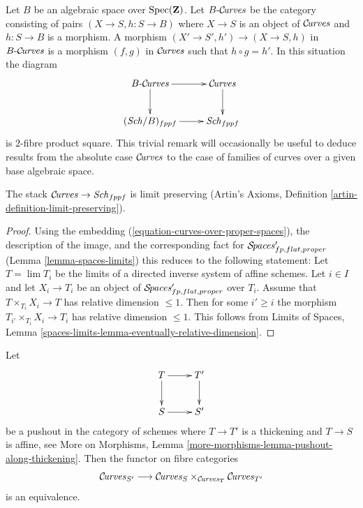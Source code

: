 \begin{remark}
\label{remark-curves-base-change}
Let $B$ be an algebraic space over $\mathop{\mathrm{Spec}}(\mathbf{Z})$.
Let $B\text{-}\mathcal{C}\!\mathit{urves}$ be the category consisting
of pairs $(X \to S, h : S \to B)$
where $X \to S$ is an object of
$\mathcal{C}\!\mathit{urves}$ and $h : S \to B$ is a morphism.
A morphism $(X' \to S', h') \to (X \to S, h)$
in $B\text{-}\mathcal{C}\!\mathit{urves}$ is a morphism $(f, g)$
in $\mathcal{C}\!\mathit{urves}$ such that $h \circ g = h'$.
In this situation the diagram
$$
\xymatrix{
B\text{-}\Curvesstack \ar[r] \ar[d] & \Curvesstack \ar[d] \\
(\Sch/B)_{fppf} \ar[r] & \Sch_{fppf}
}
$$
is $2$-fibre product square. This trivial remark
will occasionally be useful to deduce results from
the absolute case $\mathcal{C}\!\mathit{urves}$ to the case
of families of curves over a given base algebraic space.
\end{remark}

\begin{lemma}
\label{lemma-curves-limits}
The stack $\mathcal{C}\!\mathit{urves} \to \mathit{Sch}_{fppf}$ is limit preserving
(Artin's Axioms, Definition \ref{artin-definition-limit-preserving}).
\end{lemma}

\begin{proof}
Using the embedding (\ref{equation-curves-over-proper-spaces}),
the description of the image, and
the corresponding fact for $\mathcal{S}\!\mathit{paces}'_{fp, flat, proper}$
(Lemma \ref{lemma-spaces-limits})
this reduces to the following statement:
Let $T = \lim T_i$ be the limits of a
directed inverse system of affine schemes.
Let $i \in I$ and let $X_i \to T_i$ be an object of
$\mathcal{S}\!\mathit{paces}'_{fp, flat, proper}$ over $T_i$.
Assume that $T \times_{T_i} X_i \to T$ has
relative dimension $\leq 1$.
Then for some $i' \geq i$ the morphism
$T_{i'} \times_{T_i} X_i \to T_i$ has
relative dimension $\leq 1$. This follows from
Limits of Spaces, Lemma
\ref{spaces-limits-lemma-eventually-relative-dimension}.
\end{proof}

\begin{lemma}
\label{lemma-curves-RS-star}
Let
$$
\xymatrix{
T \ar[r] \ar[d] & T' \ar[d] \\
S \ar[r] & S'
}
$$
be a pushout in the category of schemes where
$T \to T'$ is a thickening and $T \to S$ is affine, see
More on Morphisms, Lemma \ref{more-morphisms-lemma-pushout-along-thickening}.
Then the functor on fibre categories
$$
\mathcal{C}\!\mathit{urves}_{S'}
\longrightarrow
\mathcal{C}\!\mathit{urves}_S
\times_{\mathcal{C}\!\mathit{urves}_T}
\mathcal{C}\!\mathit{urves}_{T'}
$$
is an equivalence.
\end{lemma}


